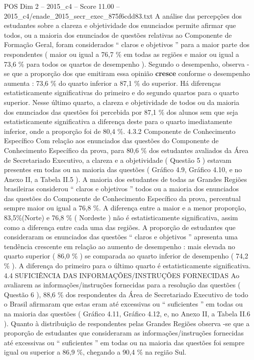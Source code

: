 \begin{textsample}{POS Dim 2 – 2015\_c4 – Score 11.00 – 2015\_c4/enade\_2015\_secr\_exec\_875f6cdd83.txt}
A análise das percepções dos estudantes sobre a clareza e objetividade dos enunciados permite afirmar que todos, ou a maioria dos enunciados de questões relativas ao Componente de Formação Geral, foram considerados “ claros e objetivos ” para a maior parte dos respondentes ( maior ou igual a 76,7 \% em todas as regiões e maior ou igual a 73,6 \% para todos os quartos de desempenho ).
Segundo o desempenho, observa -se que a proporção dos que emitiram essa opinião \textbf{cresce} conforme o desempenho aumenta : 73,6 \% do quarto inferior a 87,1 \% do superior.
Há diferenças estatisticamente significativas do primeiro e do segundo quartos para o quarto superior.
Nesse último quarto, a clareza e objetividade de todos ou da maioria dos enunciados das questões foi percebida por 87,1 \% dos alunos sem que seja estatisticamente significativa a diferença deste para o quarto imediatamente inferior, onde a proporção foi de 80,4 \%. 4.3.2 Componente de Conhecimento Específico Com relação aos enunciados das questões do Componente de Conhecimento Específico da prova, para 80,6 \% dos estudantes avaliados da Área de Secretariado Executivo, a clareza e a objetividade ( Questão 5 ) estavam presentes em todas ou na maioria das questões ( Gráfico 4.9, Gráfico 4.10, e no Anexo II, a Tabela II.5 ).
A maioria dos estudantes de todas as Grandes Regiões brasileiras considerou “ claros e objetivos ” todos ou a maioria dos enunciados das questões do Componente de Conhecimento Específico da prova, percentual sempre maior ou igual a 76,8 \%.
A diferença entre a maior e a menor proporção, 83,5\%(Norte) e 76,8 \% ( Nordeste ) não é estatisticamente significativa, assim como a diferença entre cada uma das regiões.
A proporção de estudantes que consideraram os enunciados das questões “ claros e objetivos ” apresenta uma tendência crescente em relação ao aumento de desempenho : mais elevada no quarto superior ( 86,0 \% ) se comparada ao quarto inferior de desempenho ( 74,2 \% ).
A diferença do primeiro para o último quarto é estatisticamente significativa. 4.4 SUFICIÊNCIA DAS INFORMAÇÕES/INSTRUÇÕES FORNECIDAS Ao avaliarem as informações/instruções fornecidas para a resolução das questões ( Questão 6 ), 88,6 \% dos respondentes da Área de Secretariado Executivo de todo o Brasil afirmaram que estas eram até excessivas ou “ suficientes ” em todas ou na maioria das questões ( Gráfico 4.11, Gráfico 4.12, e, no Anexo II, a Tabela II.6 ).
Quanto à distribuição de respondentes pelas Grandes Regiões observa -se que a proporção de estudantes que consideraram as informações/instruções fornecidas até excessivas ou “ suficientes ” em todas ou na maioria das questões foi sempre igual ou superior a 86,9 \%, chegando a 90,4 \% na região Sul.

\end{textsample}
